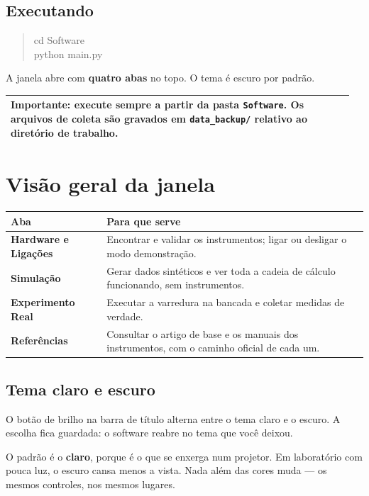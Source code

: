 \documentclass[11pt,a4paper]{article}
\newcommand{\aba}[1]{\textsf{\textbf{#1}}}
\newenvironment{aviso}
  {\par\medskip\noindent\begin{tabular}{|p{0.96\linewidth}|}\hline\rule{0pt}{3ex}}
  {\\[1ex]\hline\end{tabular}\par\medskip}
\begin{document}
\subsection{Executando}

\begin{quote}\ttfamily
cd Software\\
python main.py
\end{quote}

A janela abre com \textbf{quatro abas} no topo. O tema é escuro por padrão.

\begin{aviso}
\textbf{Importante:} execute sempre a partir da pasta \texttt{Software}. Os
arquivos de coleta são gravados em \texttt{data\_backup/} relativo ao diretório
de trabalho.
\end{aviso}

\section{Visão geral da janela}

\begin{center}
\begin{tabular}{@{}p{4.2cm}p{10.5cm}@{}}
\toprule
\textbf{Aba} & \textbf{Para que serve} \\
\midrule
\aba{Hardware e Ligações} & Encontrar e validar os instrumentos; ligar ou
desligar o modo demonstração. \\[0.4em]
\aba{Simulação} & Gerar dados sintéticos e ver toda a cadeia de cálculo
funcionando, sem instrumentos. \\[0.4em]
\aba{Experimento Real} & Executar a varredura na bancada e coletar medidas
de verdade. \\[0.4em]
\aba{Referências} & Consultar o artigo de base e os manuais dos instrumentos,
com o caminho oficial de cada um. \\
\bottomrule
\end{tabular}
\end{center}

\subsection{Tema claro e escuro}

O botão de brilho na barra de título alterna entre o tema claro e o escuro. A
escolha fica guardada: o software reabre no tema que você deixou.

O padrão é o \textbf{claro}, porque é o que se enxerga num projetor. Em
laboratório com pouca luz, o escuro cansa menos a vista. Nada além das cores
muda --- os mesmos controles, nos mesmos lugares.
\end{document}
